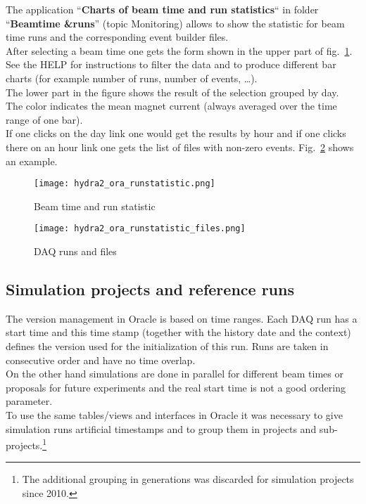 The application ``\textbf{Charts of beam time and run statistics}`` in folder ``\textbf{Beamtime \&runs}'' (topic Monitoring) allows to 
show the statistic for beam time runs and the corresponding event builder files.\\
After selecting a beam time one gets the form shown in the upper part of fig.~\ref{fig:oraRunStatistic}. See the HELP for 
instructions to filter the data and to produce different bar charts (for example number of runs, number of events, \ldots).\\
The lower part in the figure shows the result of the selection grouped by day.\\
The color indicates the mean magnet current (always averaged over the time range of one bar).\\
If one clicks on the day link one would get the 
results by hour and if one clicks there on an hour link one gets the list of files with non-zero events. 
Fig.~\ref{fig:oraDaqFiles} shows an example.
\begin{figure}[\htb]
  \centering
  \texttt{[image: hydra2\_ora\_runstatistic.png]}
  \caption[Beam time and run statistic]{Beam time and run statistic}
  \label{fig:oraRunStatistic}
\end{figure}

\begin{figure}[\htb]
  \centering
  \texttt{[image: hydra2\_ora\_runstatistic\_files.png]}
  \caption[DAQ runs and files]{DAQ runs and files}
  \label{fig:oraDaqFiles}
\end{figure}


\subsection[Simulation projects and reference runs]{Simulation projects and reference runs} \label{sec:oraSimulProjects}

The version management in Oracle is based on time ranges. Each DAQ run has a start time and this time stamp (together with 
the history date and the context) defines the version used for the initialization of this run. Runs are taken in consecutive 
order and have no time overlap.\\
On the other hand simulations are done in parallel for different beam times or proposals for future experiments and the real 
start time is not a good ordering parameter.\\
To use the same tables/views and interfaces in Oracle it was necessary to give simulation runs artificial timestamps and to group 
them in projects and sub-projects.\footnote{The additional grouping in generations was discarded for simulation 
projects since 2010.}\\

